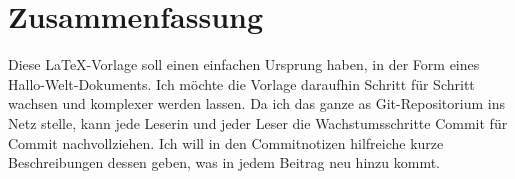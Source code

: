 \chapter{Zusammenfassung}%
Diese LaTeX-Vorlage soll einen einfachen Ursprung haben, in der Form eines Hallo-Welt-Dokuments. Ich möchte die Vorlage daraufhin Schritt für Schritt wachsen und komplexer werden lassen. Da ich das ganze as Git-Repositorium ins Netz stelle, kann jede Leserin und jeder Leser die Wachstumsschritte Commit für Commit nachvollziehen. Ich will in den Commitnotizen hilfreiche kurze Beschreibungen dessen geben, was in jedem Beitrag neu hinzu kommt.

